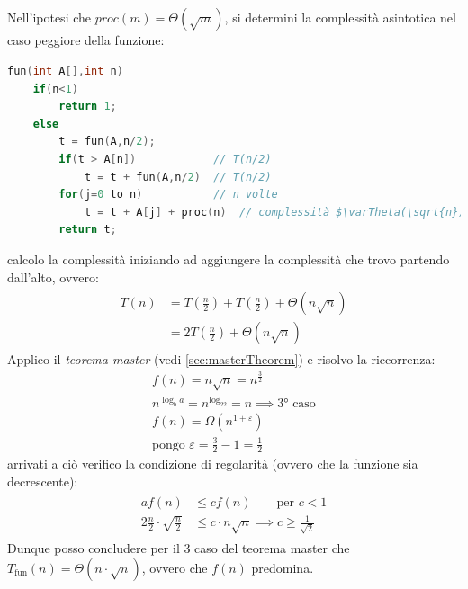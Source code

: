 \documentclass[italian]{article}
\newcommand{\fn}{f(n)}
\newcommand{\exercize}{\text{\faPencil $\;$ Esercizio }}
\begin{document}
\subsection{\exercize}
Nell'ipotesi che $proc(m) = \varTheta(\sqrt{m})$, si determini la complessità asintotica nel caso peggiore della funzione:
\begin{lstlisting}[language=c,mathescape=true]
fun(int A[],int n)
	if(n<1)
		return 1;
	else
		t = fun(A,n/2);
		if(t > A[n]) 			// T(n/2)
			t = t + fun(A,n/2)	// T(n/2)
		for(j=0 to n)			// n volte
			t = t + A[j] + proc(n)	// complessità $\varTheta(\sqrt{n})$	
		return t;
\end{lstlisting}
calcolo la complessità iniziando ad aggiungere la complessità che trovo partendo dall'alto, ovvero:
\begin{gather*}
	\begin{align*}
		T(n) &= T\left(\frac{n}{2}\right) + T\left(\frac{n}{2}\right) + \varTheta(n\sqrt{n}) \\
		&= 2T\left(\frac{n}{2}\right) + \varTheta(n\sqrt{n})
	\end{align*}
\end{gather*}
Applico il \textit{teorema master} (vedi \ref{sec:masterTheorem})  e risolvo la riccorrenza:
\begin{gather*}
	\fn = n\sqrt{n} = n^{\frac{3}{2}} \\
	n^{\log_ba} = n^{\log_22} = n \implies \text{3° caso} \\
	\fn = \varOmega(n^{1 + \varepsilon}) \\
	\text{pongo } \varepsilon = \frac{3}{2} - 1 = \frac{1}{2}
\end{gather*}
arrivati a ciò verifico la condizione di regolarità (ovvero che la funzione sia decrescente):
\begin{gather*}
	\begin{align*}
		a\fn &\leq c\fn \qquad \text{per } c < 1 \\
		2\frac{n}{2}\cdot\sqrt{\frac{n}{2}} & \leq c\cdot n\sqrt{n} \implies c \geq \frac{1}{\sqrt{2}}
	\end{align*}
\end{gather*}
Dunque posso concludere per il 3 caso del teorema master che $T_{\text{fun}}(n) = \varTheta(n\cdot\sqrt{n})$, ovvero che $\fn$ predomina.
\pagebreak
\end{document}

